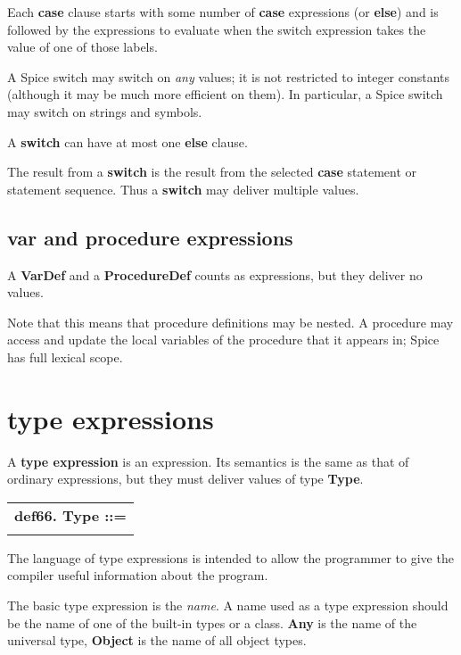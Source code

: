 \documentclass{report}
\begin{document}
Each {\bf case} clause starts with some number of {\bf case} expressions (or
{\bf else}) and is followed by the expressions to evaluate when the switch
expression takes the value of one of those labels.

A Spice switch may switch on {\em any} values; it is not restricted to integer
constants (although it may be much more efficient on them). In particular, a
Spice switch may switch on strings and symbols.

A {\bf switch} can have at most one {\bf else} clause.

The result from a {\bf switch} is the result from the selected {\bf case} statement or
statement sequence. Thus a {\bf switch} may deliver multiple values.

\subsection{var and procedure expressions}


A {\bf VarDef} and a {\bf ProcedureDef} counts as expressions, but they deliver
no values.

Note that this means that procedure definitions may be nested. A
procedure may access and update the local variables of the procedure that it
appears in; Spice has full lexical scope.

\section{type expressions}


A {\bf type expression} is an expression. Its semantics is the same as that of
ordinary expressions, but they must deliver values of type {\bf Type}.

\begin{tabular}{l}
{\bf def66. Type ::= }\\ 
\hspace*{3mm}{\tt Expr} \\ 
\end{tabular}



The language of type expressions is intended to allow the programmer
to give the compiler useful information about the program.

The basic type expression is the {\em name}. A name used as a type
expression should be the name of one of the built-in types or a
class. {\bf Any} is the name of the universal type, {\bf Object} is the
name of all object types.
\end{document}
